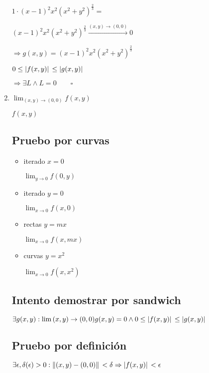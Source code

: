 \documentclass[../parcial.tex]{subfiles}
\begin{document}
\begin{enumerate}
            $ 1 \cdot (x-1)^2x^2(x^2+y^2)^{\frac{2}{3}} =  $

            $ (x-1)^2x^2(x^2+y^2)^{\frac{2}{3}} \stackrel{(x,y) \to (0,0)}{\to} 0 $

            $ \Rightarrow g(x,y) = (x-1)^2x^2(x^2+y^2)^{\frac{2}{3}} $

            $ 0 \leq \abs*{f(x,y)} \leq \abs*{g(x,y)} $

            $ \Rightarrow \exists L \wedge L = 0 \qquad \square$

        \item $ \lim_{(x,y) \to (0,0)} f(x,y) $
        
            $f(x,y)$
        
            \subsection*{Pruebo por curvas}

            \begin{itemize}
                \item iterado $ x = 0$

                    $\lim_{y\to0} f(0,y)$

                \item iterado $ y = 0$

                    $\lim_{x\to0} f(x,0)$

                \item rectas $ y = mx$
                
                    $\lim_{x\to0} f(x,mx)$

                \item curvas $ y = x^2$

                    $\lim_{x\to0} f(x,x^2)$

            \end{itemize}

            \subsection*{Intento demostrar por sandwich}
        
            $ \exists g(x,y): \lim{(x,y)\to(0,0)} g(x,y) = 0 \wedge 0 \leq \abs*{f(x,y)} \leq \abs*{g(x,y)} $
        
            \subsection*{Pruebo por definición}

            $ \exists \epsilon,\delta(\epsilon) > 0 : \norm*{(x,y) - (0,0)} < \delta \Rightarrow \abs*{f(x,y)} < \epsilon $

    \end{enumerate}
\end{document}
